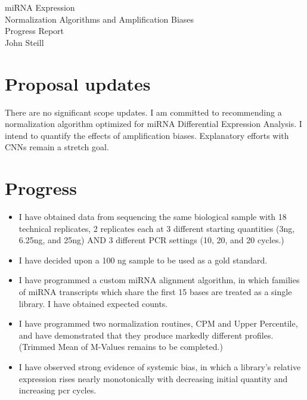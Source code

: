 \documentclass[dvips,12pt]{article}
\begin{document}
\begin{center}
{ \Large miRNA Expression} \\ {\large Normalization Algorithms and Amplification Biases \\  Progress Report \\John Steill}
\end{center}





\section{Proposal updates}
There are no significant scope updates. I am committed to recommending a normalization algorithm optimized for miRNA Differential Expression Analysis. I intend to quantify the effects of amplification biases. Explanatory efforts with CNNs remain a stretch goal. 
\section{Progress}
\begin{itemize}
	\item{I have obtained data from sequencing the same biological sample with 18 technical replicates, 2 replicates each at 3 different starting quantities (3ng, 6.25ng, and 25ng) AND 3 different PCR settings (10, 20, and 20 cycles.)}
	\item {I have decided upon a 100 ng sample to be used as a gold standard.}
	\item {I have programmed a custom miRNA alignment algorithm, in which families of miRNA transcripts which share the first 15 bases are treated as a single library. I have obtained expected counts.}
	\item {I have programmed two normalization routines, CPM and Upper Percentile, and have demonstrated that they produce markedly different profiles. (Trimmed Mean of M-Values remains to be completed.)}
	\item {I have observed strong evidence of systemic bias, in which a library's relative expression rises nearly monotonically with decreasing initial quantity and increasing pcr cycles.}
\end{itemize}
\end{document}

